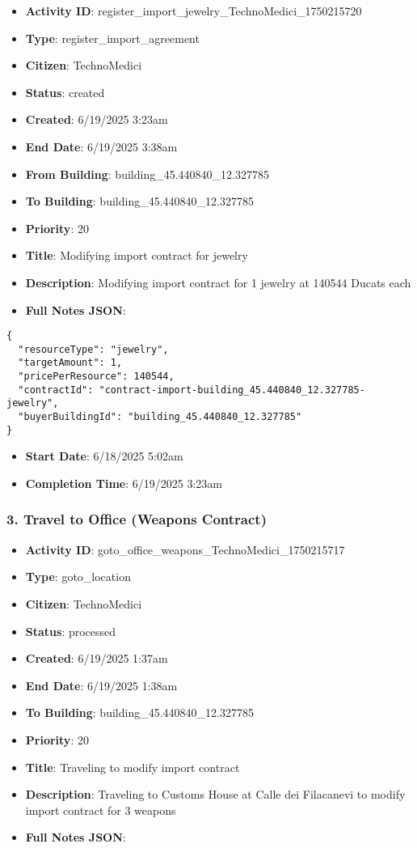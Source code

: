 \documentclass[11pt,a4paper]{article}
\begin{document}
\begin{itemize}
\item \textbf{Activity ID}: register\_import\_jewelry\_TechnoMedici\_1750215720
\item \textbf{Type}: register\_import\_agreement
\item \textbf{Citizen}: TechnoMedici
\item \textbf{Status}: created
\item \textbf{Created}: 6/19/2025 3:23am
\item \textbf{End Date}: 6/19/2025 3:38am
\item \textbf{From Building}: building\_45.440840\_12.327785
\item \textbf{To Building}: building\_45.440840\_12.327785
\item \textbf{Priority}: 20
\item \textbf{Title}: Modifying import contract for jewelry
\item \textbf{Description}: Modifying import contract for 1 jewelry at 140544 Ducats each
\item \textbf{Full Notes JSON}:
\end{itemize}

\begin{lstlisting}
{
  "resourceType": "jewelry",
  "targetAmount": 1,
  "pricePerResource": 140544,
  "contractId": "contract-import-building_45.440840_12.327785-jewelry",
  "buyerBuildingId": "building_45.440840_12.327785"
}
\end{lstlisting}

\begin{itemize}
\item \textbf{Start Date}: 6/18/2025 5:02am
\item \textbf{Completion Time}: 6/19/2025 3:23am
\end{itemize}

\subsubsection{3. Travel to Office (Weapons Contract)}

\begin{itemize}
\item \textbf{Activity ID}: goto\_office\_weapons\_TechnoMedici\_1750215717
\item \textbf{Type}: goto\_location
\item \textbf{Citizen}: TechnoMedici
\item \textbf{Status}: processed
\item \textbf{Created}: 6/19/2025 1:37am
\item \textbf{End Date}: 6/19/2025 1:38am
\item \textbf{To Building}: building\_45.440840\_12.327785
\item \textbf{Priority}: 20
\item \textbf{Title}: Traveling to modify import contract
\item \textbf{Description}: Traveling to Customs House at Calle dei Filacanevi to modify import contract for 3 weapons
\item \textbf{Full Notes JSON}:
\end{itemize}
\end{document}
